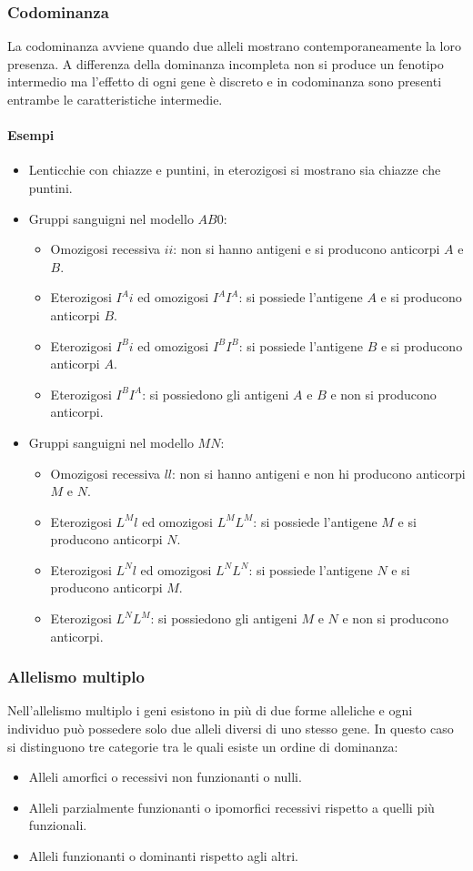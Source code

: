 \subsubsection{Codominanza}
La codominanza avviene quando due alleli mostrano contemporaneamente la loro presenza. A differenza della dominanza incompleta non si produce un fenotipo intermedio ma l'effetto di 
ogni gene \`e discreto e in codominanza sono presenti entrambe le caratteristiche intermedie.
\paragraph{Esempi}
\begin{itemize}
	\item Lenticchie con chiazze e puntini, in eterozigosi si mostrano sia chiazze che puntini. 
	\item Gruppi sanguigni nel modello $AB0$: 
		\begin{itemize}
			\item Omozigosi recessiva $ii$: non si hanno antigeni e si producono anticorpi $A$ e $B$.
			\item Eterozigosi $I^Ai$ ed omozigosi $I^AI^A$: si possiede l'antigene $A$ e si producono anticorpi $B$.
			\item Eterozigosi $I^Bi$ ed omozigosi $I^BI^B$: si possiede l'antigene $B$ e si producono anticorpi $A$.
			\item Eterozigosi $I^BI^A$: si possiedono gli antigeni $A$ e $B$ e non si producono anticorpi.
		\end{itemize}
	\item Gruppi sanguigni nel modello $MN$:
		\begin{itemize}
			\item Omozigosi recessiva $ll$: non si hanno antigeni e non hi producono anticorpi $M$ e $N$. 
			\item Eterozigosi $L^Ml$ ed omozigosi $L^ML^M$: si possiede l'antigene $M$ e si producono anticorpi $N$.
			\item Eterozigosi $L^Nl$ ed omozigosi $L^NL^N$: si possiede l'antigene $N$ e si producono anticorpi $M$.
			\item Eterozigosi $L^NL^M$: si possiedono gli antigeni $M$ e $N$ e non si producono anticorpi.
		\end{itemize}
\end{itemize}
\subsubsection{Allelismo multiplo}
Nell'allelismo multiplo i geni esistono in pi\`u di due forme alleliche e ogni individuo pu\`o possedere solo due alleli diversi di uno stesso gene. In questo caso si distinguono
tre categorie tra le quali esiste un ordine di dominanza:
\begin{itemize}
	\item Alleli amorfici o recessivi non funzionanti o nulli.
	\item Alleli parzialmente funzionanti o ipomorfici recessivi rispetto a quelli pi\`u funzionali.
	\item Alleli funzionanti o dominanti rispetto agli altri.
\end{itemize}
